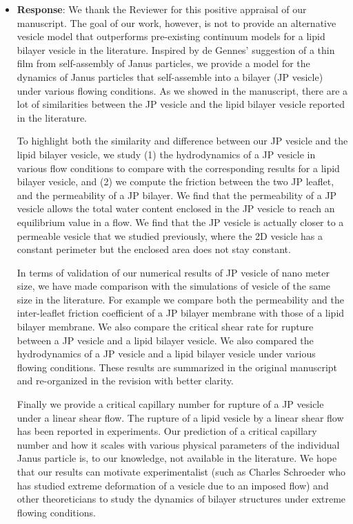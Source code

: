 \documentclass[11pt]{article}
\begin{document}
\begin{itemize}
  \item {\bf Response}: We thank the Reviewer for this positive appraisal of our manuscript.  
The goal of our work, however, is not to provide an alternative vesicle model that outperforms pre-existing continuum models for a lipid bilayer vesicle in the literature. Inspired by de Gennes' suggestion of a thin film from self-assembly of Janus particles, we provide a model for the dynamics of Janus particles that self-assemble into a bilayer (JP vesicle) under various flowing conditions. 
As we showed in the manuscript, there are a lot of similarities between the JP vesicle and the lipid bilayer vesicle reported in the literature.

To highlight both the similarity and difference between our JP vesicle and the lipid bilayer vesicle, we study (1) the hydrodynamics of a JP vesicle in various flow conditions to compare with the corresponding results for a lipid bilayer vesicle,
and (2) we compute the friction between the two JP leaflet, and the permeability of a JP bilayer. We find that the permeability of a JP vesicle allows the total water content enclosed in the JP vesicle to reach an equilibrium value in a flow. We find that the JP vesicle is actually closer to a permeable vesicle that we studied previously, where the 2D vesicle has a constant perimeter but the enclosed area does not stay constant.

In terms of validation of our numerical results of JP vesicle of nano meter size, we have made comparison with the simulations of vesicle of the same size in the literature. For example we compare both the permeability and the inter-leaflet friction coefficient of a JP bilayer membrane with those of a lipid bilayer membrane. We also compare the critical shear rate for rupture between a JP vesicle and a lipid bilayer vesicle. We also compared the hydrodynamics of a JP vesicle and a lipid bilayer vesicle under various flowing conditions. These results are summarized in the original manuscript and re-organized in the revision with better clarity. 

Finally we provide a critical capillary number for rupture of a JP vesicle under a linear shear flow. The rupture of a lipid vesicle by a linear shear flow has been reported in experiments.  Our prediction of a critical capillary number and how it scales with various physical parameters of the individual Janus particle is, to our knowledge, not available in the literature. We hope that our results can motivate experimentalist (such as Charles Schroeder who has studied extreme deformation of a vesicle due to an imposed flow) and other theoreticians to study the dynamics of bilayer structures under extreme flowing conditions.
 
\end{itemize}
\end{document}
